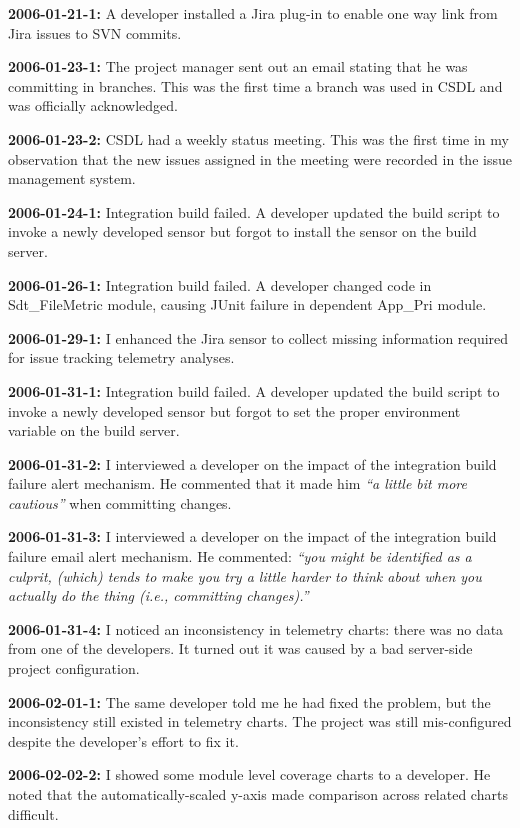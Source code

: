 \textbf{2006-01-21-1:}
A developer installed a Jira plug-in to enable one way link from Jira issues to SVN commits. 

\textbf{2006-01-23-1:}
The project manager sent out an email stating that he was committing in branches. This was the first time a branch was used in CSDL and was officially acknowledged.

\textbf{2006-01-23-2:}
CSDL had a weekly status meeting. This was the first time in my observation that the new issues assigned in the meeting were recorded in the issue management system.

\textbf{2006-01-24-1:}
Integration build failed. A developer updated the build script to invoke a newly developed sensor but forgot to install the sensor on the build server.

\textbf{2006-01-26-1:}
Integration build failed. A developer changed code in Sdt\_FileMetric module, causing JUnit failure in dependent App\_Pri module. 

\textbf{2006-01-29-1:}
I enhanced the Jira sensor to collect missing information required for issue tracking telemetry analyses.

\textbf{2006-01-31-1:}
Integration build failed. A developer updated the build script to invoke a newly developed sensor but forgot to set the proper environment variable on the build server.

\textbf{2006-01-31-2:}
I interviewed a developer on the impact of the integration build failure alert mechanism. He commented that it made him \textit{``a little bit more cautious''} when committing changes.

\textbf{2006-01-31-3:}
I interviewed a developer on the impact of the integration build failure email alert mechanism. He commented: \textit{``you might be identified as a culprit, (which) tends to make you try a little harder to think about when you actually do the thing (i.e., committing changes).''} 

\textbf{2006-01-31-4:}
I noticed an inconsistency in telemetry charts: there was no data from one of the developers. It turned out it was caused by a bad server-side project configuration.

\textbf{2006-02-01-1:}
The same developer told me he had fixed the problem, but the inconsistency still existed in telemetry charts. The project was still mis-configured despite the developer's effort to fix it.

\textbf{2006-02-02-2:}
I showed some module level coverage charts to a developer. He noted that the automatically-scaled y-axis made comparison across related charts difficult.

